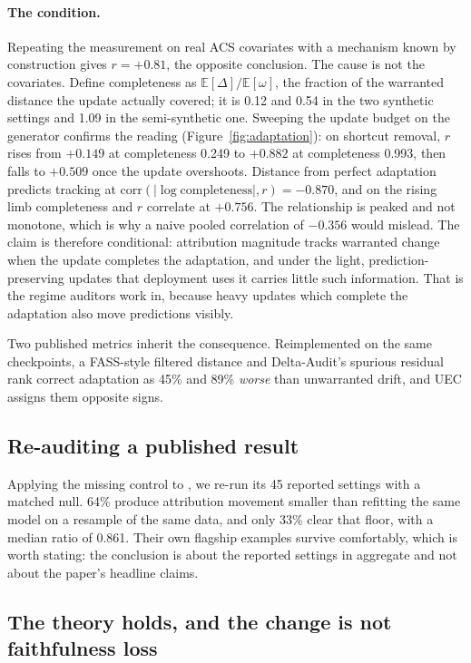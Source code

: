 \documentclass{article}
\begin{document}
\paragraph{The condition.} Repeating the measurement on real ACS covariates with a mechanism known by
construction gives $r=+0.81$, the opposite conclusion. The cause is not the covariates. Define
completeness as $\mathbb{E}[\Delta]/\mathbb{E}[\omega]$, the fraction of the warranted distance the
update actually covered; it is 0.12 and 0.54 in the two synthetic settings and 1.09 in the
semi-synthetic one. Sweeping the update budget on the generator confirms the reading
(Figure~\ref{fig:adaptation}): on shortcut removal, $r$ rises from $+0.149$ at completeness 0.249 to
$+0.882$ at completeness 0.993, then falls to $+0.509$ once the update overshoots. Distance from
perfect adaptation predicts tracking at $\mathrm{corr}(|\log\text{completeness}|,r)=-0.870$, and on
the rising limb completeness and $r$ correlate at $+0.756$. The relationship is peaked and not
monotone, which is why a naive pooled correlation of $-0.356$ would mislead. The claim is therefore
conditional: attribution magnitude tracks warranted change when the update completes the adaptation,
and under the light, prediction-preserving updates that deployment uses it carries little such
information. That is the regime auditors work in, because heavy updates which complete the adaptation
also move predictions visibly.

Two published metrics inherit the consequence. Reimplemented on the same checkpoints, a FASS-style
filtered distance and Delta-Audit's spurious residual rank correct adaptation as 45\% and 89\%
\emph{worse} than unwarranted drift, and UEC assigns them opposite signs.

\subsection{Re-auditing a published result}

Applying the missing control to \citet{deltaaudit2025}, we re-run its 45 reported settings with a
matched null. 64\% produce attribution movement smaller than refitting the same model on a resample
of the same data, and only 33\% clear that floor, with a median ratio of 0.861. Their own flagship
examples survive comfortably, which is worth stating: the conclusion is about the reported settings
in aggregate and not about the paper's headline claims.

\subsection{The theory holds, and the change is not faithfulness loss}
\label{sec:theory-check}
\end{document}
